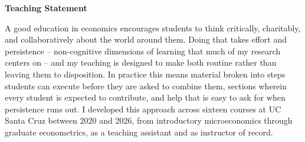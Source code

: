 \documentclass[letter,11pt]{article}
\begin{document}
\newcommand{\studentquote}[1]{\begin{quote}\itshape ``#1''\end{quote}}

\thispagestyle{firstpage}
\begin{center}
    \textbf{\large{Teaching Statement}}
\end{center}

A good education in economics encourages students to think critically, charitably, and collaboratively about the world around them. Doing that takes effort and persistence -- non-cognitive dimensions of learning that much of my research centers on -- and my teaching is designed to make both routine rather than leaving them to disposition. In practice this means material broken into steps students can execute before they are asked to combine them, sections wherein every student is expected to contribute, and help that is easy to ask for when persistence runs out. I developed this approach across sixteen courses at UC Santa Cruz between 2020 and 2026, from introductory microeconomics through graduate econometrics, as a teaching assistant and as instructor of record.
\end{document}
